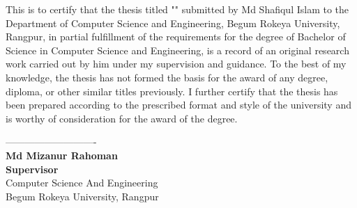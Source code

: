 \newpage
{}

This is to certify that the thesis titled "\textbf{\projectTitle}" submitted by Md Shafiqul Islam to the Department of Computer Science and Engineering, Begum Rokeya University, Rangpur, in partial fulfillment of the requirements for the degree of Bachelor of Science in Computer Science and Engineering, is a record of an original research work carried out by him under my supervision and guidance.
To the best of my knowledge, the thesis has not formed the basis for the award of any degree, diploma, or other similar titles previously.
I further certify that the thesis has been prepared according to the prescribed format and style of the university and is worthy of consideration for the award of the degree.
\vspace{2cm}
\begin{flushright}
    ----------------------------\\
    \textbf{Md Mizanur Rahoman}\\
    \textbf{Supervisor}\\
    Computer Science And Engineering\\
    Begum Rokeya University, Rangpur\\
\end{flushright}